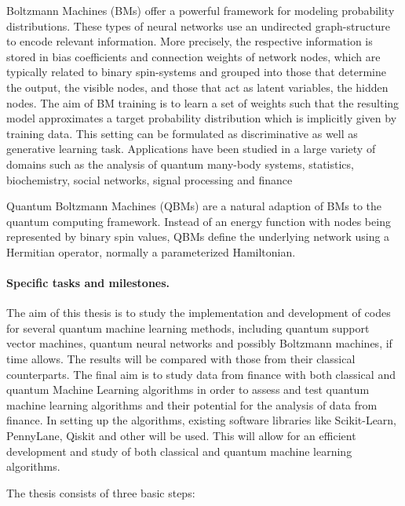 \documentclass[%
oneside,                 %
final,                   %
10pt]{article}
\begin{document}
Boltzmann Machines (BMs) offer a powerful framework for modeling
probability distributions.  These types of neural networks use an
undirected graph-structure to encode relevant information.  More
precisely, the respective information is stored in bias coefficients
and connection weights of network nodes, which are typically related
to binary spin-systems and grouped into those that determine the
output, the visible nodes, and those that act as latent variables, the
hidden nodes.
The aim of BM training is to learn a
set of weights such that the resulting model approximates a target
probability distribution which is implicitly given by training data.
This setting can be formulated as discriminative as well as generative
learning task.  Applications have been studied in a large variety of
domains such as the analysis of quantum many-body systems, statistics,
biochemistry, social networks, signal processing and finance

Quantum Boltzmann Machines (QBMs) are a natural adaption of BMs to the
quantum computing framework. Instead of an energy function with nodes
being represented by binary spin values, QBMs define the underlying
network using a Hermitian operator, normally a parameterized Hamiltonian.

\paragraph{Specific tasks and milestones.}
The aim of this thesis is to study the implementation and development
of codes for several quantum machine learning methods, including
quantum support vector machines, quantum neural networks and possibly
Boltzmann machines, if time allows. The results will be compared with
those from their classical counterparts.  The final aim is to study
data from finance with both classical and quantum Machine Learning
algorithms in order to assess and test quantum machine learning
algorithms and their potential for the analysis of data from finance.
In setting up the algorithms, existing software libraries like
Scikit-Learn, PennyLane, Qiskit and other will be used. This will allow for an efficient development and study of both classical and quantum machine learning algorithms.

The thesis consists of three basic steps:
\end{document}
